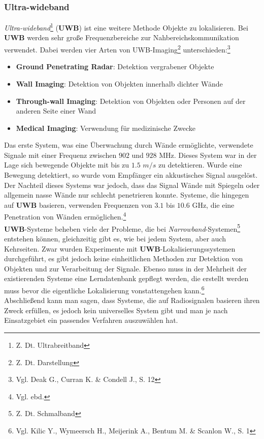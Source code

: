 \subsubsection{Ultra-wideband}

\textit{Ultra-wideband}\footnote{Z. Dt. Ultrabreitband} (\textbf{UWB}) ist eine weitere Methode Objekte zu lokalisieren. Bei \textbf{UWB} werden sehr große Frequenzbereiche zur Nahbereichskommunikation verwendet. Dabei werden vier Arten von UWB-Imaging\footnote{Z. Dt. Darstellung} unterschieden:\footnote{Vgl. Deak G.,  Curran K. \& Condell J., S. 12}
\begin{itemize}
 	\item \textbf{Ground Penetrating Radar}: Detektion vergrabener Objekte 
 	\item \textbf{Wall Imaging}: Detektion von Objekten innerhalb dichter Wände
 	\item \textbf{Through-wall Imaging}: Detektion von Objekten oder Personen auf der anderen Seite einer Wand
 	\item \textbf{Medical Imaging}: Verwendung für medizinische Zwecke
 \end{itemize} 

Das erste System, was eine Überwachung durch Wände ermöglichte, verwendete Signale mit einer Frequenz zwischen $902$ und $928$ MHz. Dieses System war in der Lage sich bewegende Objekte mit bis zu $1.5$ $m/s$ zu detektieren. Wurde eine Bewegung detektiert, so wurde vom Empfänger ein akkustisches Signal ausgelöst. Der Nachteil dieses Systems war jedoch, dass das Signal Wände mit Spiegeln oder allgemein nasse Wände nur schlecht penetrieren konnte. Systeme, die hingegen auf \textbf{UWB} basieren, verwenden Frequenzen von $3.1$ bis $10.6$ GHz, die eine Penetration von Wänden ermöglichen.\footnote{Vgl. ebd.} \\
\textbf{UWB}-Systeme beheben viele der Probleme, die bei \textit{Narrowband}-Systemen\footnote{Z. Dt. Schmalband} entstehen können, gleichzeitig gibt es, wie bei jedem System, aber auch Kehrseiten. Zwar wurden Experimente mit \textbf{UWB}-Lokalisierungssystemen durchgeführt, es gibt jedoch keine einheitlichen Methoden zur Detektion von Objekten und zur Verarbeitung der Signale. Ebenso muss in der Mehrheit der existierenden Systeme eine Lerndatenbank gepflegt werden, die erstellt werden muss bevor die eigentliche Lokalisierung vonstattengehen kann.\footnote{Vgl. Kilic Y., Wymeersch H., Meijerink A., Bentum M. \& Scanlon W., S. 1}\\
Abschließend kann man sagen, dass Systeme, die auf Radiosignalen basieren ihren Zweck erfüllen, es jedoch kein universelles System gibt und man je nach Einsatzgebiet ein passendes Verfahren auszuwählen hat.



